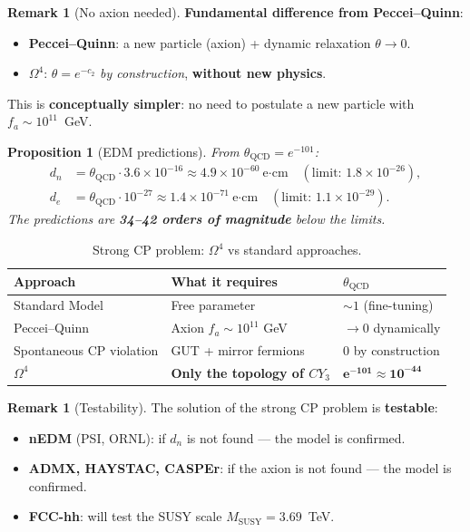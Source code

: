 \documentclass[11pt,a4paper]{article}
\newcommand{\CY}{CY_3}
\newcommand{\Om}{\Omega^4}
\newtheorem{proposition}[theorem]{Proposition}
\theoremstyle{definition}
\newtheorem{remark}[theorem]{Remark}
\begin{document}
\begin{remark}[No axion needed]
\label{rem:no-axion-review}
\textbf{Fundamental difference from Peccei--Quinn}:
\begin{itemize}
    \item \textbf{Peccei--Quinn}: a new particle (axion) +
          dynamic relaxation $\theta \to 0$.
    \item \textbf{$\Om$}: $\theta = e^{-c_2}$ \emph{by construction},
          \textbf{without new physics}.
\end{itemize}
This is \textbf{conceptually simpler}: no need to postulate a new
particle with $f_a \sim 10^{11}$~GeV.
\end{remark}

\begin{proposition}[EDM predictions]
\label{prop:edm-review}
From $\theta_{\text{QCD}} = e^{-101}$:
\begin{align}
    d_n &= \theta_{\text{QCD}} \cdot 3.6 \times 10^{-16}
        \approx 4.9 \times 10^{-60}~\text{e·cm} \quad
        (\text{limit: } 1.8 \times 10^{-26}), \\
    d_e &= \theta_{\text{QCD}} \cdot 10^{-27}
        \approx 1.4 \times 10^{-71}~\text{e·cm} \quad
        (\text{limit: } 1.1 \times 10^{-29}).
\end{align}
The predictions are \textbf{34--42 orders of magnitude} below the limits.
\end{proposition}

\begin{table}[htbp]
\centering
\caption{Strong CP problem: $\Om$ vs standard approaches.}
\label{tab:strong-cp-review}
\begin{tabular}{p{3cm}p{4.5cm}p{4.5cm}}
\toprule
Approach & What it requires & $\theta_{\text{QCD}}$ \\
\midrule
Standard Model & Free parameter & $\sim 1$ (fine-tuning) \\[0.3em]
Peccei--Quinn & Axion $f_a \sim 10^{11}$ GeV & $\to 0$ dynamically \\[0.3em]
Spontaneous CP violation & GUT + mirror fermions & $0$ by construction \\[0.3em]
\textbf{$\Om$} & \textbf{Only the topology of $\CY$} &
    $\boldsymbol{e^{-101} \approx 10^{-44}}$ \\
\bottomrule
\end{tabular}
\end{table}

\begin{remark}[Testability]
\label{rem:testability-cp-review}
The solution of the strong CP problem is \textbf{testable}:
\begin{itemize}
    \item \textbf{nEDM} (PSI, ORNL): if $d_n$ is not found
          — the model is confirmed.
    \item \textbf{ADMX, HAYSTAC, CASPEr}: if the axion is not found
          — the model is confirmed.
    \item \textbf{FCC-hh}: will test the SUSY scale $M_{\text{SUSY}} = 3.69$~TeV.
\end{itemize}
\end{remark}
\end{document}
